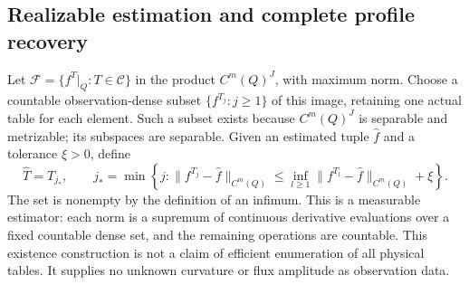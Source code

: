 \subsection{Realizable estimation and complete profile recovery}

Let $\mathcal F=\{f^T|_Q:T\in\mathscr C\}$ in the product
$C^m(Q)^J$, with maximum norm.  Choose a countable observation-dense
subset $\{f^{T_j}:j\ge1\}$ of this image, retaining one actual table
for each element.  Such a subset exists because $C^m(Q)^J$ is separable
and metrizable; its subspaces are separable.  Given an estimated tuple
$\widehat f$ and a tolerance $\xi>0$, define
\begin{equation}\label{eq:v69-selection}
 \widehat T=T_{j_*},\qquad
 j_* =\min\left\{j:
 \|f^{T_j}-\widehat f\|_{C^m(Q)}
 \le \inf_{l\ge1}\|f^{T_l}-\widehat f\|_{C^m(Q)}+\xi\right\}.
\end{equation}
The set is nonempty by the definition of an infimum.  This is a
measurable estimator: each norm is a supremum of continuous derivative
evaluations over a fixed countable dense set, and the remaining
operations are countable.  This existence construction is not a claim
of efficient enumeration of all physical tables.  It supplies no
unknown curvature or flux amplitude as observation data.

